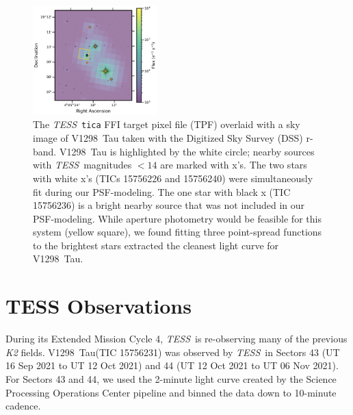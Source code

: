 \documentclass[twocolumn]{aastex631}
\newcommand{\githubicon}{{\color{black}\faGithub}}
\newcommand{\tess}{\textit{TESS}}
\newcommand{\sname}{V1298~Tau\xspace}
\begin{document}
\begin{figure}[t!]
\begin{center}
\includegraphics[width=0.43\textwidth,trim={0.25cm 0 0 0}]{static/TESSaperture.pdf}
\caption{The \tess\ \texttt{tica} FFI target pixel file (TPF) overlaid with a sky image of \sname taken with the Digitized Sky Survey (DSS) r-band. \sname is highlighted by the white circle; nearby sources with \tess\ magnitudes $< 14$ are marked with x's. The two stars with white x's (TICs 15756226 and 15756240) were simultaneously fit during our PSF-modeling. The one star with black x (TIC 15756236) is a bright nearby source that was not included in our PSF-modeling. While aperture photometry would be feasible for this system (yellow square), we found fitting three point-spread functions to the brightest stars extracted the cleanest light curve for \sname. \href{https://github.com/afeinstein20/v1298tau\_tess/blob/main/src/figures/tpf.py}{\githubicon}} \label{fig:tpf}
\end{center}
\end{figure}

\section{TESS Observations} \label{sec:observations}

During its Extended Mission Cycle 4, \tess\ is re-observing many of the previous \textit{K2} fields. \sname (TIC 15756231) was observed by \tess\ in Sectors 43 (UT 16 Sep 2021 to UT 12 Oct 2021) and 44 (UT 12 Oct 2021 to UT 06 Nov 2021). For Sectors 43 and 44, we used the 2-minute light curve created by the Science Processing Operations Center pipeline \citep[SPOC;][]{jenkinsSPOC2016} and binned the data down to 10-minute cadence.%
\end{document}
